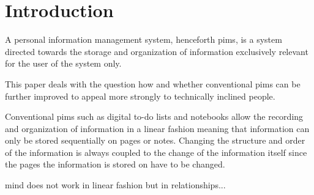 \section{Introduction}

A personal information management system, henceforth \gls{pims}, is a system
directed towards the storage and organization of information exclusively
relevant for the user of the system only.

This paper deals with the question how and whether conventional \gls{pims}
can be further improved to appeal more strongly to technically inclined
people.

Conventional \gls{pims} such as digital to-do lists and notebooks allow the
recording and organization of information in a linear fashion meaning that
information can only be stored sequentially on pages or notes. Changing the
structure and order of the information is always coupled to the change of the
information itself since the pages the information is stored on have to be
changed.

mind does not work in linear fashion but in relationships...

\iffalse
0 problem
1st problem
2nd introduction / storyline why not optimal
3rd criteria of possible solution
4rd proposition
5 conclusion / why system more optimal / research question
\fi
